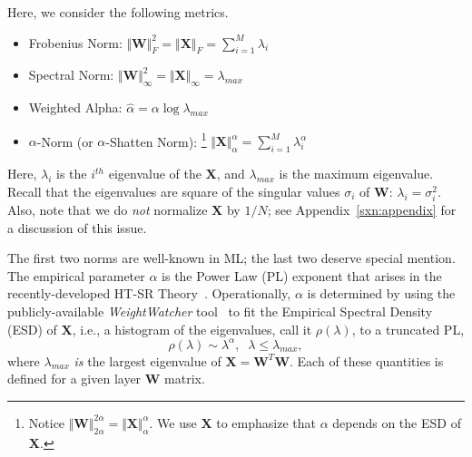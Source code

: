 Here, we consider the following metrics.

\begin{itemize}
\item 
Frobenius Norm: $\Vert\mathbf{W}\Vert^{2}_{F}=\Vert\mathbf{X}\Vert_{F}=\sum_{i=1}^{M} \lambda_{i}$
\item 
Spectral Norm: $\Vert\mathbf{W}\Vert_{\infty}^{2}=\Vert\mathbf{X}\Vert_{\infty}=\lambda_{max}$
\item 
Weighted Alpha: $\hat{\alpha}=\alpha\log\lambda_{max}$
\item 
$\alpha$-Norm (or $\alpha$-Shatten Norm):%
\footnote{Notice $\Vert\mathbf{W}\Vert^{2\alpha}_{2\alpha}=\Vert\mathbf{X}\Vert^{\alpha}_{\alpha}$. We use $\mathbf{X}$ to emphasize that $\alpha$ depends on the ESD of $\mathbf{X}$.}
 $\Vert\mathbf{X}\Vert^{\alpha}_{\alpha}=\sum_{i=1}^{M}\lambda_{i}^{\alpha}$
\end{itemize}
Here, $\lambda_{i}$ is the $i^{th}$ eigenvalue of the $\mathbf{X}$, and $\lambda_{max}$ is the maximum eigenvalue.
Recall that the eigenvalues are square of the singular values $\sigma_{i}$ of $\mathbf{W}$: $\lambda_{i}=\sigma^{2}_{i}$.
Also, note that we do \emph{not} normalize $\mathbf{X}$ by $1/N$; see Appendix~\ref{sxn:appendix} for a discussion of this issue.

The first two norms are well-known in ML; the last two deserve special mention.
The empirical parameter $\alpha$ is the Power Law (PL) exponent that arises in the recently-developed HT-SR Theory~\cite{MM18_TR, MM19_HTSR_ICML, MM20_SDM}.
Operationally, $\alpha$ is determined by using the publicly-available \emph{WeightWatcher} tool~\cite{weightwatcher_package} to fit the Empirical Spectral Density (ESD) of $\mathbf{X}$, i.e., a histogram of the eigenvalues, call it $\rho(\lambda)$, to a truncated PL, 
\begin{equation}
\rho(\lambda)\sim\lambda^{\alpha},\;\;\lambda\le\lambda_{max}  ,
\end{equation}
where $\lambda_{max}$ \emph{is} the largest eigenvalue of $\mathbf{X}=\mathbf{W}^{T}\mathbf{W}$.
Each of these quantities is defined for a given layer $\mathbf{W}$ matrix.

